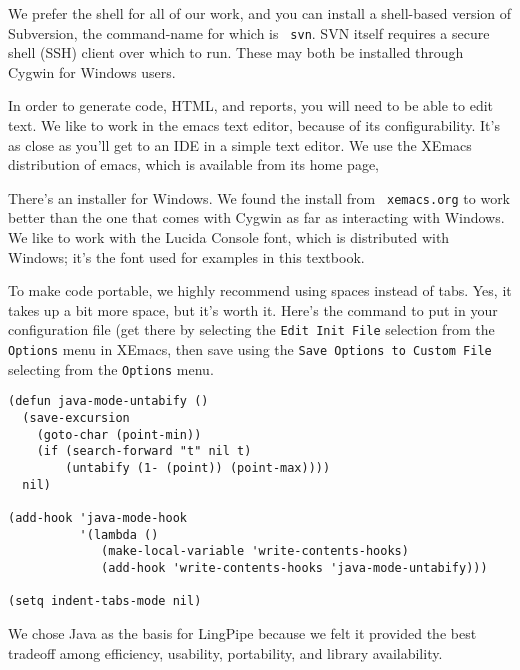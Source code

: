 We prefer the shell for all of our work, and you can install a
shell-based version of Subversion, the command-name for which is {\tt
svn}.  SVN itself requires a secure shell (SSH) client over which to
run.  These may both be installed through Cygwin for Windows users.



\noindent
In order to generate code, HTML, and reports, you will need to be able
to edit text.  We like to work in the emacs text editor, because of
its configurability.  It's as close as you'll get to an IDE in a
simple text editor.  We use the XEmacs distribution of emacs, which is
available from its home page,

\begin{quote}
\end{quote}

There's an installer for Windows.  We found the install from {\tt
xemacs.org} to work better than the one that comes with Cygwin as far
as interacting with Windows.  We like to work with the Lucida Console
font, which is distributed with Windows; it's the font used for examples
in this textbook.


\noindent
To make code portable, we highly recommend using spaces instead of
tabs.  Yes, it takes up a bit more space, but it's worth it.
Here's the command to put in your configuration file (get there
by selecting the {\tt Edit Init File} selection from the {\tt Options}
menu in XEmacs, then save using the {\tt Save Options to Custom File}
selecting from the {\tt Options} menu.

\begin{verbatim}
(defun java-mode-untabify ()
  (save-excursion
    (goto-char (point-min))
    (if (search-forward "t" nil t)
        (untabify (1- (point)) (point-max))))
  nil)

(add-hook 'java-mode-hook
          '(lambda ()
             (make-local-variable 'write-contents-hooks)
             (add-hook 'write-contents-hooks 'java-mode-untabify)))

(setq indent-tabs-mode nil)
\end{verbatim}



\noindent We chose Java as the basis for LingPipe because we felt it
provided the best tradeoff among efficiency, usability, portability,
and library availability.  


